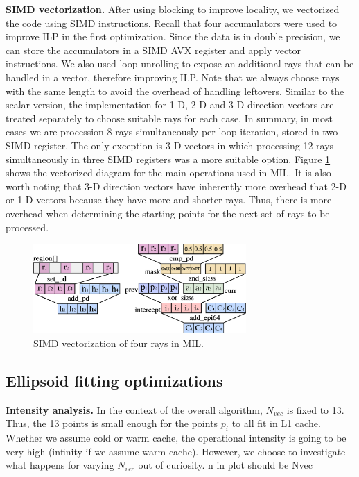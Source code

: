\documentclass[letterpaper]{article}
\newcommand{\mypar}[1]{{\bf #1.}}
\begin{document}
\mypar{SIMD vectorization}
After using blocking to improve locality, we vectorized the code using SIMD instructions. Recall that four accumulators were used to improve ILP in the first optimization. Since the data is in double precision, we can store the accumulators in a SIMD AVX register and apply vector instructions. We also used loop unrolling to expose an additional rays that can be handled in a vector, therefore improving ILP. Note that we always choose rays with the same length to avoid the overhead of handling leftovers. Similar to the scalar version, the implementation for 1-D, 2-D and 3-D direction vectors are treated separately to choose suitable rays for each case. In summary, in most cases we are procession 8 rays simultaneously per loop iteration, stored in two SIMD register. The only exception is 3-D vectors in which processing 12 rays simultaneously in three SIMD registers was a more suitable option. 
Figure \ref{fig:simd_mil} shows the vectorized diagram for the main operations used in MIL.
It is also worth noting that 3-D direction vectors have inherently more overhead that 2-D or 1-D vectors because they have more and shorter rays. Thus, there is more overhead when determining the starting points for the next set of rays to be processed.

\begin{figure}[H]
    \centering
    \includegraphics[width=3.2in]{figs/simd_mil2.eps}
    \caption{SIMD vectorization of four rays in MIL.}
    \label{fig:simd_mil}
\end{figure}


\subsection{Ellipsoid fitting optimizations} 
\mypar{Intensity analysis}  In the context of the overall algorithm, $N_{vec}$ is fixed to 13. Thus, the 13 points is small enough for the points $p_i$ to all fit in L1 cache. Whether we assume cold or warm cache, the operational intensity is going to be very high (infinity if we assume warm cache). However, we choose to investigate what happens for varying $N_{vec}$ out of curiosity. {\color{red}n in plot should be Nvec} 
\end{document}
